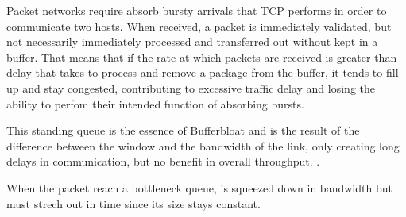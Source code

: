 Packet networks require absorb bursty arrivals that TCP performs in order to
communicate two hosts. When received, a packet is immediately validated, but
not necessarily immediately processed and transferred out without kept in a
buffer. That means that if the rate at which packets are received is greater
than delay that takes to process and remove a package from the buffer, it
tends to fill up and stay
congested, contributing to excessive traffic delay and losing the ability to
perfom their intended function of absorbing bursts.

This standing queue is the essence of Bufferbloat and is the result of the
difference between the window and the bandwidth of the link, only creating
long delays in communication, but no benefit in overall throughput. \cite{CACMStaff}.

When the packet reach a bottleneck queue, is squeezed down in bandwidth but
must strech out in time since its size stays constant.
